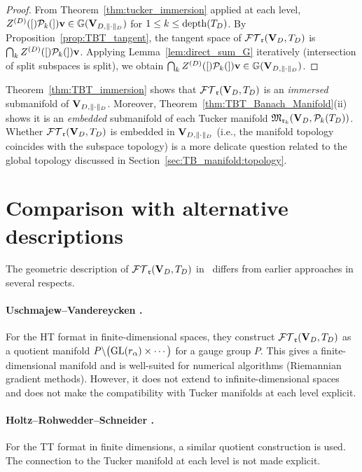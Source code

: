 \begin{proof}
From Theorem~\ref{thm:tucker_immersion} applied at each level,
$Z^{(D)}([)\mathcal{P}_{k}(]){\mathbf{v}} \in \mathbb{G}(\mathbf{V}_{D,\|\cdot\|_D})$ for $1 \leq k \leq \mathrm{depth}(T_D)$.
By Proposition~\ref{prop:TBT_tangent}, the tangent space of $\mathcal{FT}_{\mathfrak{r}}(\mathbf{V}_D,T_D)$
is $\bigcap_k Z^{(D)}([)\mathcal{P}_{k}(]){\mathbf{v}}$. Applying
Lemma~\ref{lem:direct_sum_G} iteratively (intersection of split
subspaces is split), we obtain
$\bigcap_k Z^{(D)}([)\mathcal{P}_{k}(]){\mathbf{v}} \in \mathbb{G}(\mathbf{V}_{D,\|\cdot\|_D})$.
\end{proof}

\begin{remark}
\label{rem:embedded_vs_immersed}
Theorem~\ref{thm:TBT_immersion} shows that $\mathcal{FT}_{\mathfrak{r}}(\mathbf{V}_D,T_D)$ is an
\emph{immersed} submanifold of $\mathbf{V}_{D,\|\cdot\|_D}$. Moreover,
Theorem~\ref{thm:TBT_Banach_Manifold}(ii) shows it is an
\emph{embedded} submanifold of each Tucker manifold
$\mathfrak{M}_{\mathfrak{r}_k}(\mathbf{V}_D, \mathcal{P}_{k}(T_D))$. Whether $\mathcal{FT}_{\mathfrak{r}}(\mathbf{V}_D,T_D)$ is embedded
in $\mathbf{V}_{D,\|\cdot\|_D}$ (i.e., the manifold topology coincides with the
subspace topology) is a more delicate question related to the
global topology discussed in Section~\ref{sec:TB_manifold:topology}.
\end{remark}

\section{Comparison with alternative descriptions}
\label{sec:TB_manifold:comparison}

The geometric description of $\mathcal{FT}_{\mathfrak{r}}(\mathbf{V}_D,T_D)$ in~\cite{FHN2023} differs from
earlier approaches in several respects.

\paragraph{Uschmajew--Vandereycken \cite{UschmajewVandereycken2013}.}
For the HT format in finite-dimensional spaces, they construct
$\mathcal{FT}_{\mathfrak{r}}(\mathbf{V}_D,T_D)$ as a quotient manifold
$P \backslash \bigl(\mathrm{GL}(r_\alpha) \times \cdots\bigr)$
for a gauge group $P$. This gives a finite-dimensional manifold
and is well-suited for numerical algorithms (Riemannian gradient
methods). However, it does not extend to infinite-dimensional
spaces and does not make the compatibility with Tucker manifolds
at each level explicit.

\paragraph{Holtz--Rohwedder--Schneider \cite{HoltzRohwedderSchneider2012}.}
For the TT format in finite dimensions, a similar quotient
construction is used. The connection to the Tucker manifold at
each level is not made explicit.

